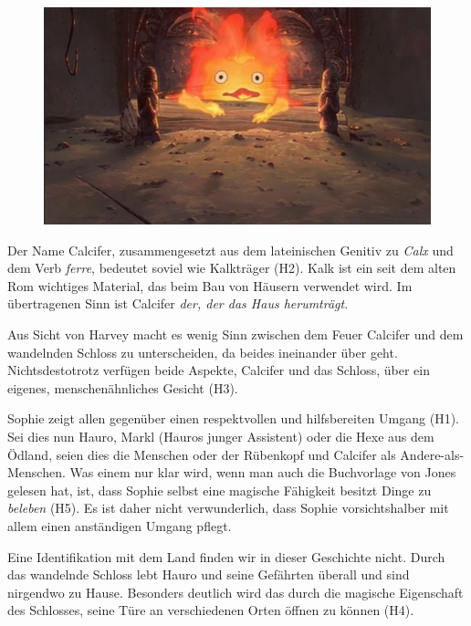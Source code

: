 \begin{figure}
\centering
  \centering
  \includegraphics[width=.8\linewidth]{images/00-21-29_calcifer.png}
  \label{fig:test1}
\end{figure}


Der Name Calcifer, zusammengesetzt aus dem lateinischen Genitiv zu \emph{Calx} und dem Verb \emph{ferre}, bedeutet soviel wie Kalkträger (H2). Kalk ist ein seit dem alten Rom wichtiges Material, das beim Bau von Häusern verwendet wird. Im übertragenen Sinn ist Calcifer \emph{der, der das Haus herumträgt}.

Aus Sicht von Harvey macht es wenig Sinn zwischen dem Feuer Calcifer und dem wandelnden Schloss zu unterscheiden, da beides ineinander über geht. Nichtsdestotrotz verfügen beide Aspekte, Calcifer und das Schloss, über ein eigenes, menschenähnliches Gesicht (H3).

Sophie zeigt allen gegenüber einen respektvollen und hilfsbereiten Umgang (H1). Sei dies nun Hauro, Markl (Hauros junger Assistent) oder die Hexe aus dem Ödland, seien dies die Menschen oder der Rübenkopf und Calcifer als Andere-als-Menschen. Was einem nur klar wird, wenn man auch die Buchvorlage von Jones gelesen hat, ist, dass Sophie selbst eine magische Fähigkeit besitzt Dinge zu \emph{beleben} (H5). Es ist daher nicht verwunderlich, dass Sophie vorsichts\-halber mit allem einen anständigen Umgang pflegt.

Eine Identifikation mit dem Land finden wir in dieser Geschichte nicht. Durch das wandelnde Schloss lebt Hauro und seine Gefährten überall und sind nirgendwo zu Hause. Besonders deutlich wird das durch die magische Eigenschaft des Schlosses, seine Türe an verschiedenen Orten öffnen zu können (H4).

